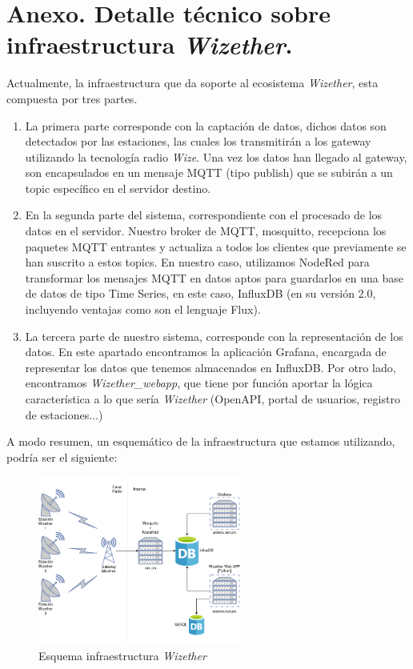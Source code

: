 \documentclass[12pt]{article}
\begin{document}
\pagebreak

\section{Anexo. Detalle técnico sobre infraestructura \textit{Wizether}.}

\noindent Actualmente, la infraestructura que da soporte al ecosistema \textit{Wizether}, esta compuesta por tres partes. 

\begin{enumerate}
	\item La primera parte corresponde con la captación de datos, dichos datos son detectados por las estaciones, las cuales los transmitirán a los gateway utilizando la tecnología radio \textit{Wize}. Una vez los datos han llegado al gateway, son encapsulados en un mensaje MQTT (tipo publish) que se subirán a un topic específico en el servidor destino.
	
	\item En la segunda parte del sistema, correspondiente con el procesado de los datos en el servidor. Nuestro broker de MQTT, mosquitto, recepciona los paquetes MQTT entrantes y actualiza a todos los clientes que previamente se han suscrito a estos topics. En nuestro caso, utilizamos NodeRed para transformar los mensajes MQTT en datos aptos para guardarlos en una base de datos de tipo Time Series, en este caso, InfluxDB (en su versión 2.0, incluyendo ventajas como son el lenguaje Flux).
	
	\item La tercera parte de nuestro sistema, corresponde con la representación de los datos. En este apartado encontramos la aplicación Grafana, encargada de representar los datos que tenemos almacenados en InfluxDB. Por otro lado, encontramos \textit{Wizether\_webapp}, que tiene por función aportar la lógica característica a lo que sería \textit{Wizether} (OpenAPI, portal de usuarios, registro de estaciones...)
\end{enumerate}

\noindent A modo resumen, un esquemático de la infraestructura que estamos utilizando, podría ser el siguiente:

\begin{figure}[h]
	\begin{center}
		\includegraphics[width=0.6\textwidth]{img_rani/WizeTher_infraestructura.png}
		\caption{Esquema infraestructura \textit{Wizether}}
	\end{center}
\end{figure}
\end{document}

